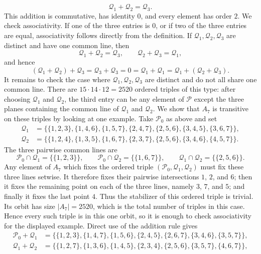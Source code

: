 \documentclass[../Odyssey_Project.tex]{subfiles}
\begin{document}
\begin{solution}
\[
    \mathcal Q_1+\mathcal Q_2=\mathcal Q_3.
\]
This addition is commutative, has identity $0$, and every element has order $2$. We check associativity. If one of the three entries is $0$, or if two of the three entries are equal, associativity follows directly from the definition. If $\mathcal Q_1,\mathcal Q_2,\mathcal Q_3$ are distinct and have one common line, then
\[
    \mathcal Q_1+\mathcal Q_2=\mathcal Q_3,\qquad
    \mathcal Q_2+\mathcal Q_3=\mathcal Q_1,
\]
and hence
\[
    (\mathcal Q_1+\mathcal Q_2)+\mathcal Q_3
    =
    \mathcal Q_3+\mathcal Q_3
    =
    0
    =
    \mathcal Q_1+\mathcal Q_1
    =
    \mathcal Q_1+(\mathcal Q_2+\mathcal Q_3).
\]
It remains to check the case where $\mathcal Q_1,\mathcal Q_2,\mathcal Q_3$ are distinct and do not all share one common line. There are $15\cdot 14\cdot 12=2520$ ordered triples of this type: after choosing $\mathcal Q_1$ and $\mathcal Q_2$, the third entry can be any element of $\mathcal P$ except the three planes containing the common line of $\mathcal Q_1$ and $\mathcal Q_2$. We show that $A_7$ is transitive on these triples by looking at one example. Take $\mathcal P_0$ as above and set
\[
\begin{aligned}
    \mathcal Q_1&=\{\{1,2,3\},\{1,4,6\},\{1,5,7\},\{2,4,7\},\{2,5,6\},\{3,4,5\},\{3,6,7\}\},\\
    \mathcal Q_2&=\{\{1,2,4\},\{1,3,5\},\{1,6,7\},\{2,3,7\},\{2,5,6\},\{3,4,6\},\{4,5,7\}\}.
\end{aligned}
\]
The three pairwise common lines are
\[
    \mathcal P_0\cap\mathcal Q_1=\{\{1,2,3\}\},\qquad
    \mathcal P_0\cap\mathcal Q_2=\{\{1,6,7\}\},\qquad
    \mathcal Q_1\cap\mathcal Q_2=\{\{2,5,6\}\}.
\]
Any element of $A_7$ which fixes the ordered triple $(\mathcal P_0,\mathcal Q_1,\mathcal Q_2)$ must fix these three lines setwise. It therefore fixes their pairwise intersections $1$, $2$, and $6$; then it fixes the remaining point on each of the three lines, namely $3$, $7$, and $5$; and finally it fixes the last point $4$. Thus the stabilizer of this ordered triple is trivial. Its orbit has size $|A_7|=2520$, which is the total number of triples in this case. Hence every such triple is in this one orbit, so it is enough to check associativity for the displayed example. Direct use of the addition rule gives
\[
\begin{aligned}
    \mathcal P_0+\mathcal Q_1
    &=
    \{\{1,2,3\},\{1,4,7\},\{1,5,6\},\{2,4,5\},\{2,6,7\},\{3,4,6\},\{3,5,7\}\},\\
    \mathcal Q_1+\mathcal Q_2
    &=
    \{\{1,2,7\},\{1,3,6\},\{1,4,5\},\{2,3,4\},\{2,5,6\},\{3,5,7\},\{4,6,7\}\},

\end{aligned}\]
\end{solution}
\end{document}
